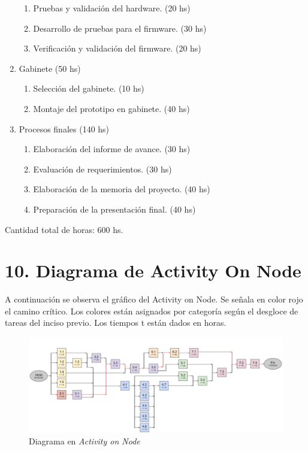 \documentclass[
11pt, %
codirector, %
]{charter}
\begin{document}
\begin{enumerate}
\begin{enumerate}
	\item Pruebas y validación del hardware. (20 hs)
	\item Desarrollo de pruebas para el firmware. (30 hs)
	\item Verificación y validación del firmware. (20 hs)
	\end{enumerate}
\item Gabinete (50 hs)
	\begin{enumerate}
	\item Selección del gabinete. (10 hs)
	\item Montaje del prototipo en gabinete. (40 hs)
	\end{enumerate}
\item Procesos finales (140 hs)
	\begin{enumerate}
	\item Elaboración del informe de avance. (30 hs)
	\item Evaluación de requerimientos. (30 hs)
	\item Elaboración de la memoria del proyecto. (40 hs)
	\item Preparación de la presentación final. (40 hs)
	\end{enumerate}
\end{enumerate}


Cantidad total de horas: 600 hs.

\section{10. Diagrama de Activity On Node}
\label{sec:AoN}

A continuación se observa el gráfico del Activity on Node. Se señala en color rojo el camino crítico.
Los colores están asignados por categoría según el desgloce de tareas del inciso previo. Los tiempos t están dados en horas.

\begin{figure}[htpb]
\centering 
\includegraphics[width=1.08\textwidth]{./Figuras/Activity On Node.jpg}
\caption{Diagrama en \textit{Activity on Node}}
\label{fig:AoN}
\end{figure}
\end{document}
